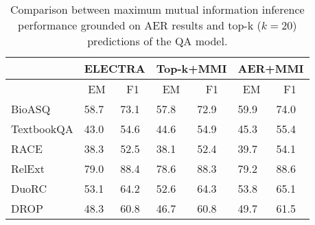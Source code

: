 \documentclass[11pt,a4paper]{article}
\begin{document}
\begin{table}[]
\small
\begin{tabular}{@{}lllllll@{}}
\toprule
           & \multicolumn{2}{c}{\textbf{ELECTRA}}            & \multicolumn{2}{c}{\textbf{Top-k+MMI}}          & \multicolumn{2}{c}{\textbf{AER+MMI}}            \\ \midrule
           & \multicolumn{1}{c}{EM} & \multicolumn{1}{c}{F1} & \multicolumn{1}{c}{EM} & \multicolumn{1}{c}{F1} & \multicolumn{1}{c}{EM} & \multicolumn{1}{c}{F1} \\
           \hdashline[1.5pt/2pt]
BioASQ     & 58.7                   & 73.1                   & 57.8                       & 72.9                       & 59.9                   & 74.0                   \\
TextbookQA & 43.0                   & 54.6                   & 44.6                       & 54.9                       & 45.3                   & 55.4                   \\
RACE       & 38.3                   & 52.5                   & 38.1                       & 52.4                       & 39.7                       & 54.1                       \\
RelExt     & 79.0                   & 88.4                   & 78.6                       & 88.3                       & 79.2                       & 88.6                       \\
DuoRC      & 53.1                   & 64.2                   &  52.6                      & 64.3                       & 53.8                       & 65.1                       \\
DROP       & 48.3                   & 60.8                   & 46.7                       & 60.8                       & 49.7                       & 61.5                       \\ \bottomrule
\end{tabular}
\caption{Comparison between maximum mutual information inference performance grounded on AER results and top-k ($k=20$) predictions of the QA model.}
\label{tab:aer-mmi}
\end{table}
\end{document}
